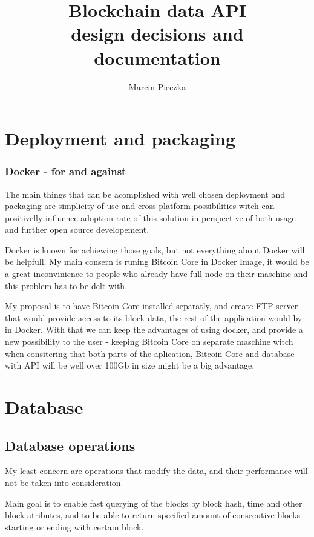 \documentclass{article}
\begin{document}
\title{
	Blockchain data API \\
	\large design decisions and documentation
}
\date{}
\author{Marcin Pieczka}
\maketitle

\section{Deployment and packaging}
\subsubsection*{Docker - for and against}

The main things that can be acomplished with well chosen deployment and packaging are simplicity of use and cross-platform possibilities witch can positivelly influence adoption rate of this solution in perspective of both usage and further open source developement.

Docker is known for achiewing those goals, but not everything about Docker will be helpfull. My main consern is runing Bitcoin Core in Docker Image, it would be a great inconvinience to people who already have full node on their maschine and this problem has to be delt with.

My proposal is to have Bitcoin Core installed separatly, and create FTP server that would provide access to its block data, the rest of the application would by in Docker. With that we can keep the advantages of using docker, and provide a new possibility to the user - keeping Bitcoin Core on separate maschine witch when consitering that both parts of the aplication, Bitcoin Core and database with API will be well over 100Gb in size might be a big advantage. 

\section{Database}
\subsection*{Database operations}
My least concern are operations that modify the data, and their performance will not be taken into consideration

Main goal is to enable fast querying of the blocks by block hash, time and other block atributes, and to be able to return specified amount of consecutive blocks starting or ending with certain block. 
\end{document}
